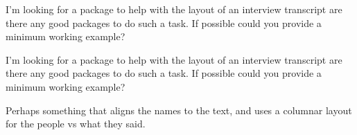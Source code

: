\documentclass{article}
\begin{document}
\begin{description}

  \Bob I'm looking for a package to help with the layout of an
  interview transcript are there any good packages to do such a
  task. If possible could you provide a minimum working example?

  \Billy I'm looking for a package to help with the layout of an
  interview transcript are there any good packages to do such a
  task. If possible could you provide a minimum working example?

  \xxx Perhaps something that aligns the names to the text, and uses a
  columnar layout for the people vs what they said.

\end{description}
\end{document}
